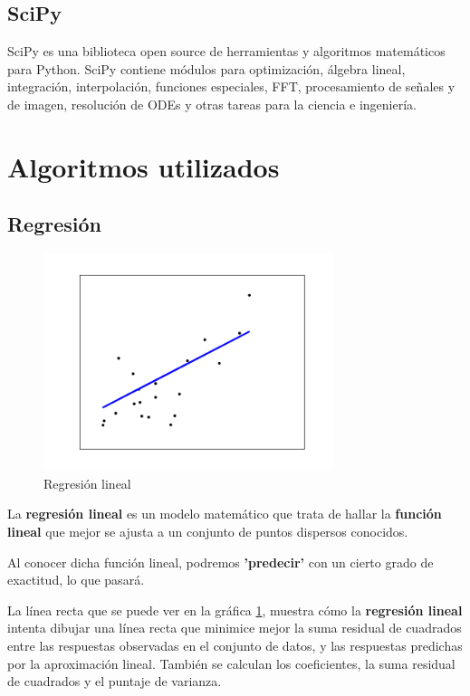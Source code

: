 	\subsection{SciPy}
	SciPy es una biblioteca open source de herramientas y algoritmos matemáticos para Python. SciPy contiene módulos para optimización, álgebra lineal, integración, interpolación, funciones especiales, FFT, procesamiento de señales y de imagen, resolución de ODEs y otras tareas para la ciencia e ingeniería.
	
\section{Algoritmos utilizados}
\label{makereference3.3}
	\subsection{Regresión}
	
	\begin{figure}[htb]
		
		\begin{center}
			\includegraphics[height=2.5in]{figures/regression.png}
			\caption{Regresión lineal}
		\end{center}
		
		\label{figure3}
	\end{figure}

	La \textbf{regresión lineal} es un modelo matemático que trata de hallar la \textbf{función lineal} que mejor se ajusta a un conjunto de puntos dispersos conocidos.
	
	Al conocer dicha función lineal, podremos \textbf{'predecir'} con un cierto grado de exactitud, lo que pasará.
	
	La línea recta que se puede ver en la gráfica \ref{figure3}, muestra cómo la \textbf{regresión lineal} intenta dibujar una línea recta que minimice mejor la suma residual de cuadrados entre las respuestas observadas en el conjunto de datos, y las respuestas predichas por la aproximación lineal.
	También se calculan los coeficientes, la suma residual de cuadrados y el puntaje de varianza.
	
